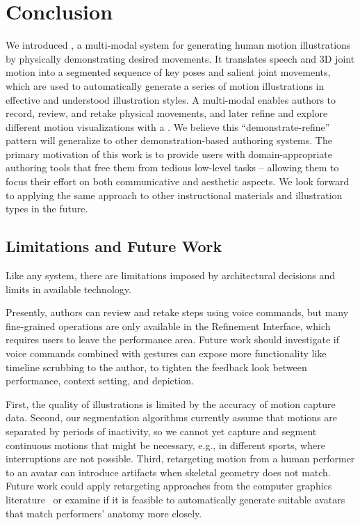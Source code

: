 \section {Conclusion}
We introduced \systemname{}, a multi-modal system for generating human motion illustrations by physically demonstrating desired movements.
It translates speech and 3D joint motion into a segmented sequence of key poses and salient joint movements, which are used to automatically generate a series of motion illustrations in effective and understood illustration styles.
%
A multi-modal \phaseI{} enables authors to record, review, and retake physical movements, and later refine and explore different motion visualizations with a \phaseII{}. We believe this ``demonstrate-refine'' pattern will generalize to other demonstration-based authoring systems.
%
The primary motivation of this work is to provide users with domain-appropriate authoring tools that free them from tedious low-level tasks -- allowing them to focus their effort on both communicative and aesthetic aspects. We look forward to applying the same approach to other instructional materials and illustration types in the future.


\subsection{Limitations and Future Work}
Like any system, there are limitations imposed by architectural decisions and limits in available technology.

 Presently, authors can review and retake steps using voice commands, but many fine-grained operations are only available in the Refinement Interface, which requires users to leave the performance area. Future work should investigate if voice commands combined with gestures can expose more functionality like timeline scrubbing to the author, to tighten the feedback look between performance, context setting, and depiction.

 First, the quality of \systemname{} illustrations is limited by the accuracy of motion capture data.
%
Second, our segmentation algorithms currently assume that motions are separated by periods of inactivity, so we cannot yet capture and segment continuous motions that might be necessary, e.g., in different sports, where interruptions are not possible.
%
Third, retargeting motion from a human performer to an avatar can introduce artifacts when skeletal geometry does not match. Future work could apply retargeting approaches from the computer graphics literature~\cite{gleicher1998retargetting} or examine if it is feasible to automatically generate suitable avatars that match performers' anatomy more closely.


